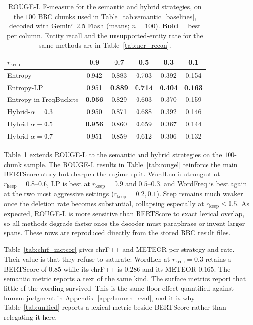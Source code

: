 \documentclass[11pt]{article}
\newcommand{\rkeep}{r_{\mathrm{keep}}}
\begin{document}
\begin{table}[tbp]
\centering
\small
\caption{ROUGE-L F-measure for the semantic and hybrid strategies, on the $100$ BBC chunks used in
Table~\ref{tab:semantic_baselines}, decoded with Gemini~2.5 Flash (means; $n{=}100$). \textbf{Bold} = best per column. Entity recall and
the unsupported-entity rate for the same methods are in Table~\ref{tab:ner_recon}.}
\label{tab:rougel_semantic}
\begin{tabular}{lccccc}
\toprule
$\rkeep$ & 0.9 & 0.7 & 0.5 & 0.3 & 0.1 \\
\midrule
Entropy                 & 0.942 & 0.883 & 0.703 & 0.392 & 0.154 \\
Entropy-LP              & 0.951 & \textbf{0.889} & \textbf{0.714} & \textbf{0.404} & \textbf{0.163} \\
Entropy-in-FreqBuckets  & \textbf{0.956} & 0.829 & 0.603 & 0.370 & 0.159 \\
Hybrid-$\alpha{=}0.3$   & 0.950 & 0.871 & 0.688 & 0.392 & 0.146 \\
Hybrid-$\alpha{=}0.5$   & \textbf{0.956} & 0.860 & 0.659 & 0.367 & 0.144 \\
Hybrid-$\alpha{=}0.7$   & 0.951 & 0.859 & 0.612 & 0.306 & 0.132 \\
\bottomrule
\end{tabular}
\end{table}

Table~\ref{tab:rougel_semantic} extends ROUGE-L to the semantic and hybrid strategies on the $100$-chunk
sample. The ROUGE-L results in Table~\ref{tab:rougel} reinforce the main BERTScore story but sharpen the regime split. WordLen is strongest at $\rkeep = 0.8$--$0.6$, LP is best at $\rkeep = 0.9$ and $0.5$--$0.3$, and WordFreq is best again at the two most aggressive settings ($\rkeep = 0.2, 0.1$). Step remains much weaker once the deletion rate becomes substantial, collapsing especially at $\rkeep \le 0.5$. As expected, ROUGE-L is more sensitive than BERTScore to exact lexical overlap, so all methods degrade faster once the decoder must paraphrase or invent larger spans. These rows are reproduced directly from the stored BBC result files.

Table~\ref{tab:chrf_meteor} gives chrF++ and METEOR per strategy and rate. Their value is that they
refuse to saturate: WordLen at $\rkeep = 0.3$ retains a BERTScore of $0.85$ while its chrF++ is $0.286$ and
its METEOR $0.165$. The semantic metric reports a text of the same kind. The surface metrics report that
little of the wording survived. This is the same floor effect quantified against human judgment in
Appendix~\ref{app:human_eval}, and it is why Table~\ref{tab:unified} reports a lexical metric beside
BERTScore rather than relegating it here.
\end{document}
